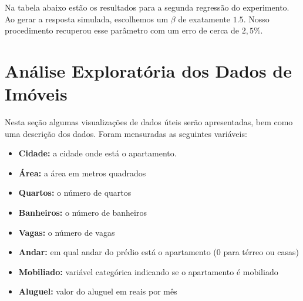 \begin{figure}[H]
    \centering
    
\end{figure}

Na tabela abaixo estão os resultados para a segunda regressão do experimento. Ao gerar a resposta simulada, escolhemos um $\beta$ de exatamente $1.5$. Nosso procedimento recuperou esse parâmetro com um erro de cerca de $2,5\%$.






\section{Análise Exploratória dos Dados de Imóveis}

Nesta seção algumas visualizações de dados úteis serão apresentadas, bem como uma descrição dos dados. Foram mensuradas as seguintes variáveis:

\begin{itemize}
    \item \textbf{Cidade:} a cidade onde está o apartamento.
    \item \textbf{Área:} a área em metros quadrados
    \item \textbf{Quartos:} o número de quartos
    \item \textbf{Banheiros:} o número de banheiros
    \item \textbf{Vagas:} o número de vagas
    \item \textbf{Andar:} em qual andar do prédio está o apartamento (0 para térreo ou casas)
    \item \textbf{Mobiliado:} variável categórica indicando se o apartamento é mobiliado
    \item \textbf{Aluguel:} valor do aluguel em reais por mês
\end{itemize}



